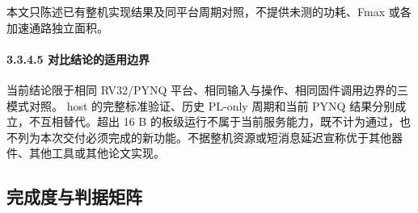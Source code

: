 本文只陈述已有整机实现结果及同平台周期对照，不提供未测的功耗、Fmax 或各加速通路独立面积。

\Needspace{85pt}

\paragraph{3.3.4.5 对比结论的适用边界}

当前结论限于相同 RV32/PYNQ 平台、相同输入与操作、相同固件调用边界的三模式对照。 host 的完整标准验证、历史 PL-only 周期和当前 PYNQ 结果分别成立，不互相替代。超出 16 B 的板级运行不属于当前服务能力，既不计为通过，也不列为本次交付必须完成的新功能。不据整机资源或短消息延迟宣称优于其他器件、其他工具或其他论文实现。


\Needspace{85pt}

\subsection{完成度与判据矩阵}


